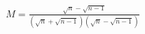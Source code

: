 \documentclass[preview]{standalone}
\begin{document}
\begin{align*}
M = \frac{\sqrt{n}-\sqrt{n-1}}{(\sqrt{n}+\sqrt{n-1})(\sqrt{n}-\sqrt{n-1})}
\end{align*}
\end{document}
